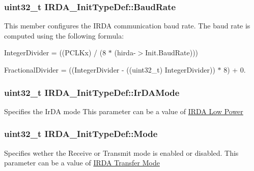 \subsubsection[{\texorpdfstring{Baud\+Rate}{BaudRate}}]{\setlength{\rightskip}{0pt plus 5cm}uint32\+\_\+t I\+R\+D\+A\+\_\+\+Init\+Type\+Def\+::\+Baud\+Rate}\hypertarget{struct_i_r_d_a___init_type_def_a3a96057c13882e04fde01040b18a0eec}{}\label{struct_i_r_d_a___init_type_def_a3a96057c13882e04fde01040b18a0eec}
This member configures the I\+R\+DA communication baud rate. The baud rate is computed using the following formula\+:
\begin{DoxyItemize}
\item Integer\+Divider = ((P\+C\+L\+Kx) / (8 $\ast$ (hirda-\/$>$Init.\+Baud\+Rate)))
\item Fractional\+Divider = ((Integer\+Divider -\/ ((uint32\+\_\+t) Integer\+Divider)) $\ast$ 8) + 0. 
\end{DoxyItemize}
\subsubsection[{\texorpdfstring{Ir\+D\+A\+Mode}{IrDAMode}}]{\setlength{\rightskip}{0pt plus 5cm}uint32\+\_\+t I\+R\+D\+A\+\_\+\+Init\+Type\+Def\+::\+Ir\+D\+A\+Mode}\hypertarget{struct_i_r_d_a___init_type_def_a88f1b73ae470fddd4e75b70cf5175040}{}\label{struct_i_r_d_a___init_type_def_a88f1b73ae470fddd4e75b70cf5175040}
Specifies the Ir\+DA mode This parameter can be a value of \hyperlink{group___i_r_d_a___low___power}{I\+R\+DA Low Power} 
\subsubsection[{\texorpdfstring{Mode}{Mode}}]{\setlength{\rightskip}{0pt plus 5cm}uint32\+\_\+t I\+R\+D\+A\+\_\+\+Init\+Type\+Def\+::\+Mode}\hypertarget{struct_i_r_d_a___init_type_def_ad10e4fcdb63d30534ce771d57c0f3ffb}{}\label{struct_i_r_d_a___init_type_def_ad10e4fcdb63d30534ce771d57c0f3ffb}
Specifies wether the Receive or Transmit mode is enabled or disabled. This parameter can be a value of \hyperlink{group___i_r_d_a___mode}{I\+R\+DA Transfer Mode} 
